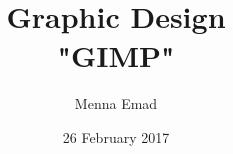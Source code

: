 \documentclass[a4paper,12pt]{book}
\begin{document}
\author{Menna Emad}
\title{Graphic Design \\ "GIMP"}
\date{26 February 2017}

\frontmatter
\maketitle
\tableofcontents{}

\mainmatter







\backmatter
\end{document}
